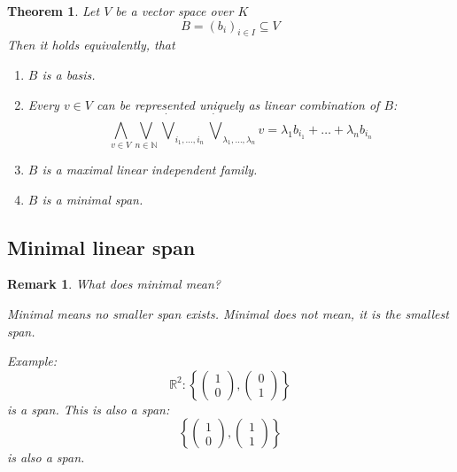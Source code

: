 \documentclass[a4paper,landscape,twocolumn]{article}
\newcommand\set[1]{\left\{#1\right\}}
\newtheorem{theorem}{Theorem}[section]
\newtheorem{rem}{Remark}[section]
\begin{document}
\begin{theorem}
  \label{thm:vector-space-statements}
  Let $V$ be a vector space over $K$
  \[ B = (b_i)_{i \in I} \subseteq V \]
  Then it holds equivalently, that
  \begin{enumerate}
    \item $B$ is a basis.
    \item Every $v \in V$ can be represented uniquely as linear combination of $B$:
      \[
        \bigwedge_{v \in V} \bigvee_{n \in \mathbb N}
        \dot\bigvee_{i_1, \ldots, i_n} \dot\bigvee_{\lambda_1, \ldots, \lambda_n} v
        = \lambda_1 b_{i_1} + \ldots + \lambda_n b_{i_n}
      \]
    \item $B$ is a maximal linear independent family.
    \item $B$ is a minimal span.
  \end{enumerate}
\end{theorem}

\subsection{Minimal linear span}

\begin{rem}
  What does \emph{minimal} mean?

  Minimal means no smaller span exists.
  Minimal does not mean, it is the smallest span.

  Example:
  \[ \mathbb R^2: \set{\begin{pmatrix} 1 \\ 0 \end{pmatrix}, \begin{pmatrix} 0 \\ 1 \end{pmatrix}} \]
  is a span. This is also a span:
  \[ \set{\begin{pmatrix} 1 \\ 0 \end{pmatrix}, \begin{pmatrix} 1 \\ 1 \end{pmatrix}} \]
  is also a span.
\end{rem}
\end{document}
